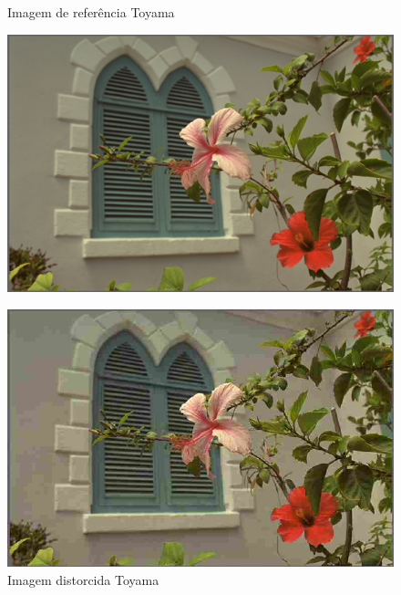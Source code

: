 \begin{figure}[htb]
 \label{fig:toyaex}
 \centering
  \begin{minipage}{0.45\textwidth}
    \centering
    \caption{Imagem de referência Toyama} \label{fig:toyaref}
    \includegraphics[scale=0.33]{../img/toyaref07.pdf}
  \end{minipage}
  \hfill
  \begin{minipage}{0.45\textwidth}
    \centering
    \caption{Imagem distorcida Toyama} \label{fig:toyadist}
    \includegraphics[scale=0.80]{../img/toyadist07_79.pdf}
  \end{minipage}
\end{figure}
